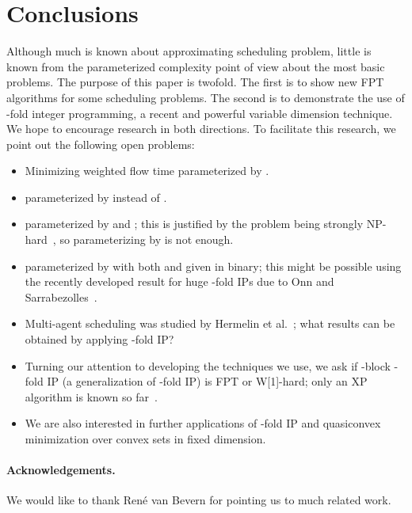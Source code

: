 \documentclass{llncs}
\newcommand{\FPT}{{\sf FPT}\xspace}
\newcommand{\XP}{{\sf XP}\xspace}
\newcommand{\NP}{{\sf NP}\xspace}
\newcommand{\W}[1]{{\sf W}[#1]\xspace}
\begin{document}
\section{Conclusions}
Although much is known about approximating scheduling problem, little is known from the parameterized complexity point of view about the most basic problems. The purpose of this paper is twofold. The first is to show new \FPT algorithms for some scheduling problems. The second is to demonstrate the use of -fold integer programming, a recent and powerful variable dimension technique. We hope to encourage research in both directions. To facilitate this research, we point out the following open problems:




\begin{itemize}
  \item Minimizing weighted flow time  parameterized by .
  \item  parameterized by  instead of .
  \item  parameterized by  and ; this is justified by the problem being strongly \NP-hard~\cite{Sitters:05}, so parameterizing by  is not enough.
  \item  parameterized by  with both  and  given in binary; this might be possible using the recently developed result for huge -fold IPs due to Onn and Sarrabezolles~\cite{OnnS:15}.
  \item Multi-agent scheduling was studied by Hermelin et al.~\cite{HermelinKSTW15}; what results can be obtained by applying -fold IP?
  \item Turning our attention to developing the techniques we use, we ask if -block -fold IP (a generalization of -fold IP) is \FPT or \W{1}-hard; only an \XP algorithm is known so far~\cite{HemmeckeKW14}.
  \item We are also interested in further applications of -fold IP and quasiconvex minimization over convex sets in fixed dimension.
\end{itemize}

\paragraph{Acknowledgements.}
We would like to thank René van Bevern for pointing us to much related work.







\end{document}
